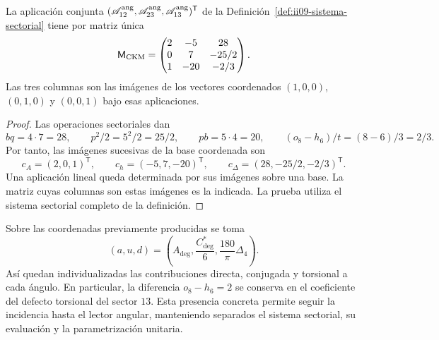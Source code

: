 \begin{theorem}
\label{thm:ii09-matriz-sectorial}
La aplicación conjunta
\((\mathscr A_{12}^{\rm ang},\mathscr A_{23}^{\rm ang},
\mathscr A_{13}^{\rm ang})^{\mathsf T}\) de la
Definición~\ref{def:ii09-sistema-sectorial} tiene por matriz única
\[
 \mathsf M_{\rm CKM}=
 \begin{pmatrix}
 2&-5&28\\
 0&7&-25/2\\
 1&-20&-2/3
 \end{pmatrix}.
\]
Las tres columnas son las imágenes de los vectores coordenados
\((1,0,0)\), \((0,1,0)\) y \((0,0,1)\) bajo esas aplicaciones.
\end{theorem}
\begin{proof}
Las operaciones sectoriales dan
\[
 bq=4\cdot7=28,\qquad p^2/2=5^2/2=25/2,
 \qquad pb=5\cdot4=20,\qquad
 (o_8-h_6)/t=(8-6)/3=2/3.
\]
Por tanto, las imágenes sucesivas de la base coordenada son
\[
 c_A=(2,0,1)^{\mathsf T},\qquad
 c_h=(-5,7,-20)^{\mathsf T},\qquad
 c_\Delta=(28,-25/2,-2/3)^{\mathsf T}.
\]
Una aplicación lineal queda determinada por sus imágenes sobre una
base. La matriz cuyas columnas son estas imágenes es la indicada.
La prueba utiliza el sistema sectorial completo de la definición.
\end{proof}

Sobre las coordenadas previamente producidas se toma
\[
 (a,u,d)=\left(A_{\deg},\frac{C^*_{\deg}}6,
                       \frac{180}{\pi}\Delta_4\right).
\]
Así quedan individualizadas las contribuciones directa, conjugada
y torsional a cada ángulo. En particular, la diferencia
\(o_8-h_6=2\) se conserva en el coeficiente del defecto torsional
del sector \(13\). Esta presencia concreta permite seguir la
incidencia hasta el lector angular, manteniendo separados el
sistema sectorial, su evaluación y la parametrización unitaria.
